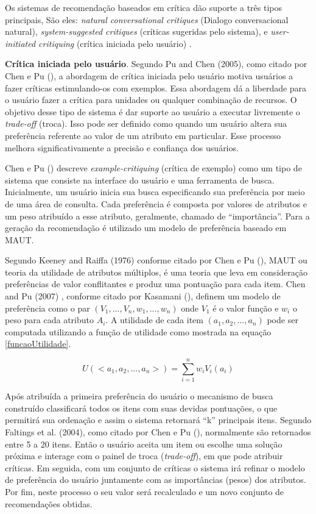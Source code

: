 Os sistemas de recomendação baseados em crítica dão suporte a três tipos principais, São eles: \textit{natural conversational critiques} (Dialogo conversacional natural), \textit{system-suggested critiques} (críticas sugeridas pelo sistema), e \textit{user-initiated critiquing} (crítica iniciada pelo usuário) \cite{Chen:2012}.

\textbf{Crítica iniciada pelo usuário}. Segundo Pu and Chen (2005), como citado por Chen e Pu (\citeyear{Chen:2012}), a abordagem de crítica iniciada pelo usuário motiva usuários a fazer críticas estimulando-os com exemplos. Essa abordagem dá a liberdade para o usuário fazer a crítica para unidades ou qualquer combinação de recursos. O objetivo desse tipo de sistema é dar suporte ao usuário a executar livremente o \textit{trade-off} (troca). Isso pode ser definido como quando um usuário altera sua preferência referente ao valor de um atributo em particular. Esse processo melhora significativamente a precisão e confiança dos usuários.

Chen e Pu (\citeyear{Chen:2012}) descreve \textit{example-critiquing} (crítica de exemplo) como um tipo de sistema que consiste na interface do usuário e uma ferramenta de busca. Inicialmente, um usuário inicia sua busca especificando sua preferência por meio de uma área de consulta. Cada preferência é composta por valores de atributos e um peso atribuído a esse atributo, geralmente, chamado de “importância”. Para a geração da recomendação é utilizado um modelo de preferência baseado em MAUT.

Segundo Keeney and Raiffa (1976) conforme citado por Chen e Pu (\citeyear{Chen:2012}), MAUT ou teoria da utilidade de atributos múltiplos, é uma teoria que leva em consideração preferências de valor conflitantes e produz uma pontuação para cada item. Chen and Pu (2007) , conforme citado por Kasamani (\citeyear{Kasamani:2017}), definem um modelo de preferência como o par \((V_1, ..., V_n, w_1, ..., w_n)\) onde \(V_1\) é o valor função e \(w_i\) o peso para cada atributo \(A_i\). A utilidade de cada item \((a_1, a_2, ..., a_n)\) pode ser computada utilizando a função de utilidade como mostrada na equação \eqref{funcaoUtilidade}.

\begin{equation}
    \label{funcaoUtilidade}
    U(<a_1,a_2,...,a_n>)=\sum_{i=1}^{n} w_i V_i(a_i)
\end{equation}

Após atribuída a primeira preferência do usuário o mecanismo de busca construído classificará todos os itens com suas devidas pontuações, o que permitirá sua ordenação e assim o sistema retornará “k” principais itens. Segundo Faltings et al. (2004), como citado por Chen e Pu (\citeyear{Chen:2012}), normalmente são retornados entre 5 a 20 itens. Então o usuário aceita um item ou escolhe uma solução próxima e interage com o painel de troca (\textit{trade-off}), em que pode atribuir críticas. Em seguida, com um conjunto de críticas o sistema irá refinar o modelo de preferência do usuário juntamente com as importâncias (pesos) dos atributos. Por fim, neste processo o seu valor será recalculado e um novo conjunto de recomendações obtidas.

